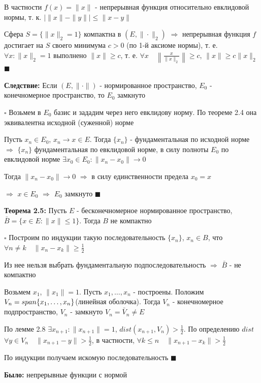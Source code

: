 \documentclass[a4paper]{report}
\newcommand*{\hm}[1]{#1\nobreak\discretionary{}%
            {\hbox{$\mathsurround=0pt #1$}}{}}
\begin{document}
В частности $f(x)=\|x\|$ - непрерывная функция относительно евклидовой нормы, т. к. $\left|\|x\|-\|y\|\right|\le\|x-y\|$

Сфера $S=\{\|x\|_2=1\}$ компактна в $(E,\|\cdot\|_2)$ $\Rightarrow$ непрерывная функция $f$ достигает на $S$ своего минимума
$c>0$ (по 1-й аксиоме нормы), т. е. $\forall x\colon\|x\|_2=1$ выполнено $\|x\|\ge c$, т. е. $\forall x\quad\left\|
\frac{x}{\|x\|_2}\right\|\ge c$, $\|x\|\ge c\|x\|_2$ $\blacksquare$
\bigskip

\noindent\textbf{Следствие:} Если $(E,\|\cdot\|)$ - нормированное пространство, $E_0$ - конечномерное пространство, то 
$E_0$ замкнуто

\noindent $\square$ Возьмем в $E_0$ базис и зададим через него евклидову норму. По теореме 2.4 она эквивалентна исходной 
(суженной) норме

Пусть $x_n\in E_0$, $x_n\to x\in E$. Тогда $\{x_n\}$ - фундаментальная по исходной норме $\Rightarrow$ $\{x_n\}$ фундаментальная 
по евклидовой норме, в силу полноты $E_0$ по евклидовой норме $\exists x_0\in E_0\colon\|x_n-x_0\|\to0$

Тогда $\|x_n-x_0\|\to0$ $\Rightarrow$ в силу единственности предела $x_0=x$

$\Rightarrow$ $x\in E_0$ $\Rightarrow$ $E_0$ замкнуто $\blacksquare$
\bigskip

\noindent\textbf{Теорема 2.5:} Пусть $E$ - бесконечномерное нормированное пространство, $\bar B=\{x\in E\colon\|x\|\le1\}$. 
Тогда $B$ не компактно

\noindent $\square$ Построим по индукции такую последовательность $\{x_n\}$, $x_n\in B$, что $\forall n\ne k\quad\|x_n-x_k\|
\ge\frac12$

Из нее нельзя выбрать фундаментальную подпоследовательность $\Rightarrow$ $\bar B$ - не компактно

Возьмем $x_1$, $\|x_1\|=1$. Пусть $x_1,\ldots,x_n$ - построены. Положим $V_n\hm=span\{x_1,\ldots,x_n\}$(линейная оболочка). 
Тогда $V_n$ - конечномерное подпространство, $V_n$ - замкнуто $V_n=\bar V_n\ne E$

По лемме 2.8 $\exists x_{n+1}\colon\|x_{n+1}\|=1$, $dist(x_{n+1},V_n)>\frac12$. По определению $dist$ $\forall y\in V_n
\quad\|x_{n+1}-y\|>\frac12$, в частности, $\forall k\le n\quad\|x_{n+1}-x_k\|>\frac12$

По индукции получаем искомую последовательность $\blacksquare$
\bigskip
\bigskip

\noindent\textbf{Было:} непрерывные функции с нормой
\end{document}
